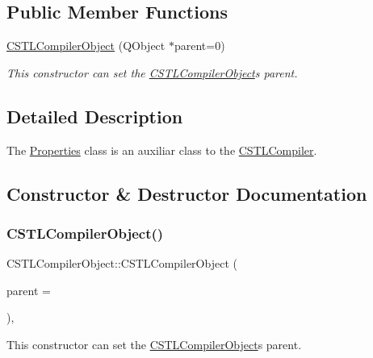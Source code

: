 \subsection*{Public Member Functions}
\begin{DoxyCompactItemize}
\item 
\hyperlink{class_c_s_t_l_compiler_object_a2294b0d059e39bab8ee31b99fb65c9c5}{C\+S\+T\+L\+Compiler\+Object} (Q\+Object $\ast$parent=0)
\begin{DoxyCompactList}\small\item\em This constructor can set the \hyperlink{class_c_s_t_l_compiler_object}{C\+S\+T\+L\+Compiler\+Object}\textquotesingle{}s parent. \end{DoxyCompactList}\end{DoxyCompactItemize}


\subsection{Detailed Description}
The \hyperlink{class_properties}{Properties} class is an auxiliar class to the \hyperlink{class_c_s_t_l_compiler}{C\+S\+T\+L\+Compiler}. 

\subsection{Constructor \& Destructor Documentation}
\mbox{\label{class_c_s_t_l_compiler_object_a2294b0d059e39bab8ee31b99fb65c9c5}} 
\subsubsection{\texorpdfstring{C\+S\+T\+L\+Compiler\+Object()}{CSTLCompilerObject()}}
{\footnotesize\ttfamily C\+S\+T\+L\+Compiler\+Object\+::\+C\+S\+T\+L\+Compiler\+Object (\begin{DoxyParamCaption}\item[{Q\+Object $\ast$}]{parent = {} }\end{DoxyParamCaption})\hspace{0.3cm}{\ttfamily [inline]}, {\ttfamily [explicit]}}



This constructor can set the \hyperlink{class_c_s_t_l_compiler_object}{C\+S\+T\+L\+Compiler\+Object}\textquotesingle{}s parent. 


